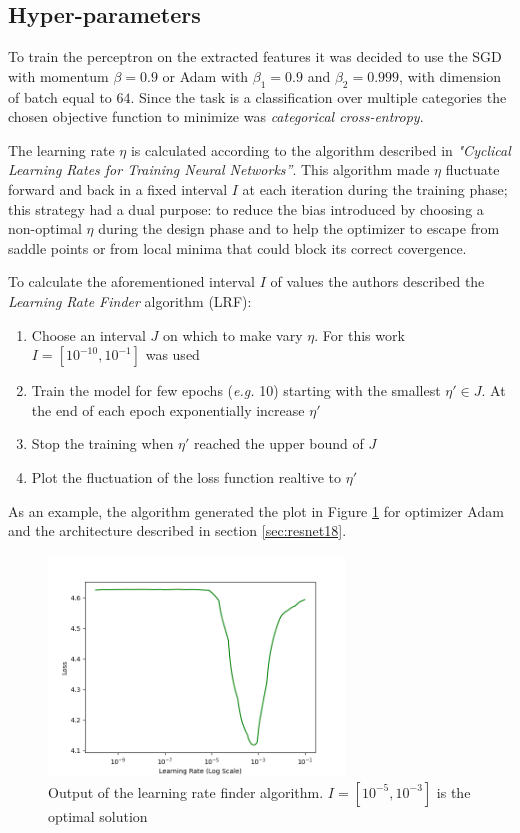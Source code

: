 \subsection{Hyper-parameters}
To train the perceptron on the extracted features it was decided to use the SGD with momentum $\beta = 0.9$ or Adam with $\beta_1 = 0.9$ and $\beta_2 = 0.999$, with dimension of
batch equal to $64$.
Since the task is a classification over multiple categories the chosen objective function to minimize was \emph{categorical cross-entropy}. \par

The learning rate $\eta$ is calculated according to the algorithm described in \emph{"Cyclical Learning Rates for Training Neural
Networks”}. This algorithm made $\eta$ fluctuate forward and
back in a fixed interval $I$ at each iteration during the training phase;
this strategy had a dual purpose: to reduce the bias introduced by choosing a non-optimal $\eta$ during the design phase and to help the optimizer to escape from saddle points or 
from local minima that could block its correct covergence.\par

To calculate the aforementioned interval $I$ of values the authors described the \textit{Learning Rate Finder} algorithm (LRF):
\begin{enumerate}
\item{Choose an interval $J$ on which to make vary $\eta$. For this work $I = [10^{-10}, 10^{-1}]$ was used} 
\item{Train the model for few epochs (\textit{e.g.} 10) starting with the smallest ${\eta}' \in J$. At the end of each epoch exponentially increase ${\eta}'$}
\item{Stop the training when ${\eta}'$ reached the upper bound of $J$}
\item{Plot the fluctuation of the loss function realtive to ${\eta}'$}
\end{enumerate}
As an example, the algorithm generated the plot in Figure \ref{fig:lr} for optimizer Adam and the architecture described in section \ref{sec:resnet18}. 
\begin{figure}[ht]
\centering
\includegraphics[width=0.7\textwidth]{images/lr_adam.png} 
\caption{Output of the learning rate finder algorithm. $I=[10^{-5}, 10^{-3}]$ is the optimal solution}
\label{fig:lr}
\end{figure}


